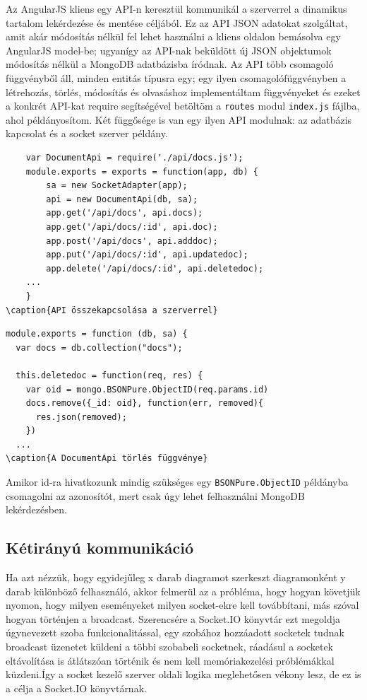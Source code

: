 Az AngularJS kliens egy API-n keresztül kommunikál a szerverrel a dinamikus tartalom lekérdezése és mentése céljából. Ez az API JSON adatokat szolgáltat, amit akár módosítás nélkül fel lehet használni a kliens oldalon bemásolva egy AngularJS model-be; ugyanígy az API-nak beküldött új JSON objektumok módosítás nélkül a MongoDB adatbázisba íródnak. Az API több csomagoló függvényből áll, minden entitás típusra egy; egy ilyen csomagolófüggvényben a létrehozás, törlés, módosítás és olvasáshoz implementáltam függvényeket és ezeket a konkrét API-kat require segítségével betöltöm a \lstinline{routes} modul \lstinline{index.js} fájlba, ahol példányosítom. Két függősége is van egy ilyen API modulnak: az adatbázis kapcsolat és a socket szerver példány.

\begin{lstlisting}
    var DocumentApi = require('./api/docs.js');
    module.exports = exports = function(app, db) {
        sa = new SocketAdapter(app);
        api = new DocumentApi(db, sa);
        app.get('/api/docs', api.docs);
        app.get('/api/docs/:id', api.doc);
        app.post('/api/docs', api.adddoc);
        app.put('/api/docs/:id', api.updatedoc);
        app.delete('/api/docs/:id', api.deletedoc);
    ...
    }
\caption{API összekapcsolása a szerverrel}
\end{lstlisting}

\begin{lstlisting}
module.exports = function (db, sa) {
  var docs = db.collection("docs");

  this.deletedoc = function(req, res) {
    var oid = mongo.BSONPure.ObjectID(req.params.id)
    docs.remove({_id: oid}, function(err, removed){
      res.json(removed);
    })  
  ...
\caption{A DocumentApi törlés függvénye}
\end{lstlisting}

Amikor id-ra hivatkozunk mindig szükséges egy \lstinline{BSONPure.ObjectID} példányba csomagolni az azonosítót, mert csak úgy lehet felhasználni MongoDB lekérdezésben.

\subsection{Kétirányú kommunikáció}

Ha azt nézzük, hogy egyidejűleg x darab diagramot szerkeszt diagramonként y darab különböző felhasználó, akkor felmerül az a próbléma, hogy hogyan követjük nyomon, hogy milyen eseményeket milyen socket-ekre kell továbbítani, más szóval hogyan történjen a broadcast. Szerencsére a Socket.IO könyvtár ezt megoldja úgynevezett szoba funkcionalitással, egy szobához hozzáadott socketek tudnak broadcast üzenetet küldeni a többi szobabeli socketnek, ráadásul a socketek eltávolítása is átlátszóan történik és nem kell memóriakezelési próblémákkal küzdeni.Így a socket kezelő szerver oldali logika meglehetősen vékony lesz, de ez is a célja a Socket.IO könyvtárnak. 

